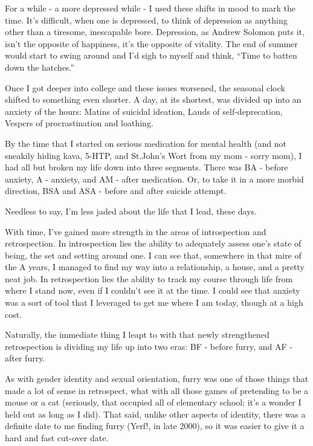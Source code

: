 For a while - a more depressed while - I used these shifts in mood to mark the time. It's difficult, when one is depressed, to think of depression as anything other than a tiresome, inescapable bore. Depression, as Andrew Solomon puts it, isn't the opposite of happiness, it's the opposite of vitality. The end of summer would start to swing around and I'd sigh to myself and think, ``Time to batten down the hatches.''

Once I got deeper into college and these issues worsened, the seasonal clock shifted to something even shorter. A day, at its shortest, was divided up into an anxiety of the hours: Matins of suicidal ideation, Lauds of self-deprecation, Vespers of procrastination and loathing.

By the time that I started on serious medication for mental health (and not sneakily hiding kava, 5-HTP, and St.John's Wort from my mom - sorry mom), I had all but broken my life down into three segments. There was BA - before anxiety, A - anxiety, and AM - after medication. Or, to take it in a more morbid direction, BSA and ASA - before and after suicide attempt.

Needless to say, I'm less jaded about the life that I lead, these days.

With time, I've gained more strength in the areas of introspection and retrospection. In introspection lies the ability to adequately assess one's state of being, the set and setting around one. I can see that, somewhere in that mire of the A years, I managed to find my way into a relationship, a house, and a pretty neat job. In retrospection lies the ability to track my course through life from where I stand now, even if I couldn't see it at the time. I could see that anxiety was a sort of tool that I leveraged to get me where I am today, though at a high cost.

Naturally, the immediate thing I leapt to with that newly strengthened retrospection is dividing my life up into two eras: BF - before furry, and AF - after furry.

As with gender identity and sexual orientation, furry was one of those things that made a lot of sense in retrospect, what with all those games of pretending to be a mouse or a cat (seriously, that occupied all of elementary school; it's a wonder I held out as long as I did). That said, unlike other aspects of identity, there was a definite date to me finding furry (Yerf!, in late 2000), so it was easier to give it a hard and fast cut-over date.

